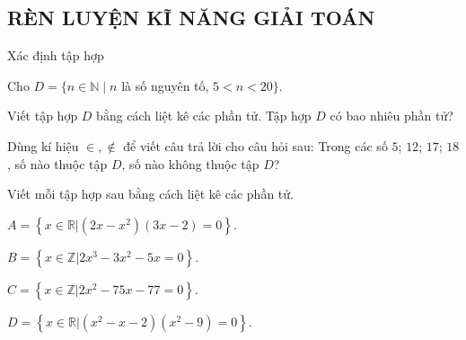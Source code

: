 \subsection{RÈN LUYỆN KĨ NĂNG GIẢI TOÁN}
\begin{dang}{Xác định tập hợp}
\end{dang}

\begin{vd}%
	Cho $D=\{n \in \mathbb{N} \mid n$ là số nguyên tố, $5<n<20\}$.
	\begin{enumEX}{1}
		\item Viết tập hợp $D$ bằng cách liệt kê các phần tử. Tập hợp $D$ có bao nhiêu phần tử?
		\item Dùng kí hiệu $\in, \notin$ để viết câu trả lời cho câu hỏi sau: Trong các số $5$; $12$; $17$; $18$, số nào thuộc tập $D$, số nào không thuộc tập $D$?
	\end{enumEX}
\end{vd}

\begin{vd}
	Viết mỗi tập hợp sau bằng cách liệt kê các phần tử.
	\begin{enumEX}{2}
		\item $A=\left\{\left. x\in \mathbb{R}\right|\left(2x-x^2\right)\left(3x-2\right)=0\right\}$.
		\item $B=\left\{\left. x\in \mathbb{Z}\right|2x^3-3x^2-5x=0\right\}$.
		\item $C=\left\{\left. x\in \mathbb{Z}\right|2x^2-75x-77=0\right\}$.
		\item $D=\left\{\left. x\in \mathbb{R}\right|(x^2-x-2)(x^2-9)=0\right\}$.
	\end{enumEX}
\end{vd}

